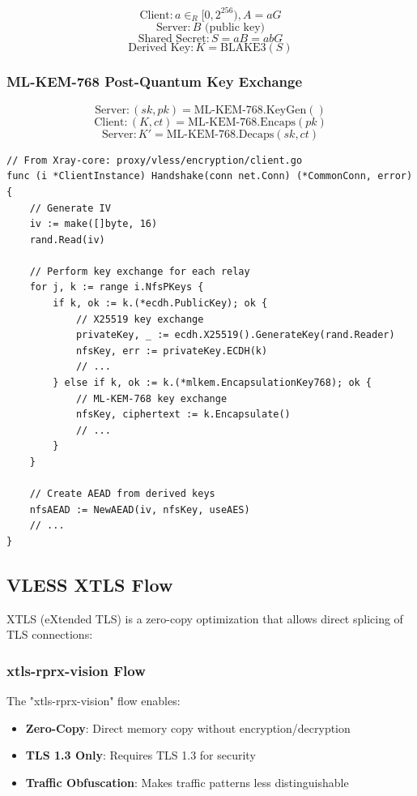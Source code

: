 \[
\text{Client}: a \in_R [0, 2^{256}), A = aG
\]
\[
\text{Server}: B \text{ (public key)}
\]
\[
\text{Shared Secret}: S = aB = abG
\]
\[
\text{Derived Key}: K = \text{BLAKE3}(S)
\]

\subsubsection{ML-KEM-768 Post-Quantum Key Exchange}

\[
\text{Server}: (sk, pk) = \text{ML-KEM-768.KeyGen}()
\]
\[
\text{Client}: (K, ct) = \text{ML-KEM-768.Encaps}(pk)
\]
\[
\text{Server}: K' = \text{ML-KEM-768.Decaps}(sk, ct)
\]

\begin{verbatim}
// From Xray-core: proxy/vless/encryption/client.go
func (i *ClientInstance) Handshake(conn net.Conn) (*CommonConn, error) {
    // Generate IV
    iv := make([]byte, 16)
    rand.Read(iv)
    
    // Perform key exchange for each relay
    for j, k := range i.NfsPKeys {
        if k, ok := k.(*ecdh.PublicKey); ok {
            // X25519 key exchange
            privateKey, _ := ecdh.X25519().GenerateKey(rand.Reader)
            nfsKey, err := privateKey.ECDH(k)
            // ...
        } else if k, ok := k.(*mlkem.EncapsulationKey768); ok {
            // ML-KEM-768 key exchange
            nfsKey, ciphertext := k.Encapsulate()
            // ...
        }
    }
    
    // Create AEAD from derived keys
    nfsAEAD := NewAEAD(iv, nfsKey, useAES)
    // ...
}
\end{verbatim}

\subsection{VLESS XTLS Flow}

XTLS (eXtended TLS) is a zero-copy optimization that allows direct splicing of TLS connections:

\subsubsection{xtls-rprx-vision Flow}

The "xtls-rprx-vision" flow enables:
\begin{itemize}
    \item \textbf{Zero-Copy}: Direct memory copy without encryption/decryption
    \item \textbf{TLS 1.3 Only}: Requires TLS 1.3 for security
    \item \textbf{Traffic Obfuscation}: Makes traffic patterns less distinguishable
\end{itemize}

